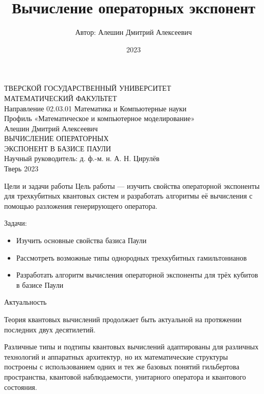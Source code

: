 \documentclass[9pt,pdf,hyperref={unicode=true}]{beamer}
\title{Вычисление операторных экспонент}
\author{Автор: Алешин Дмитрий Алексеевич}
\date{2023}
\begin{document}

\begin{frame}
\begin{center}
{\fontsize{10pt}{12pt}\selectfont
ТВЕРСКОЙ ГОСУДАРСТВЕННЫЙ УНИВЕРСИТЕТ\\
МАТЕМАТИЧЕСКИЙ ФАКУЛЬТЕТ}\\
{\fontsize{10pt}{14pt}\selectfont
    Направление 02.03.01 Математика и Компьютерные науки\\
    Профиль «Математическое и компьютерное моделирование»} \\
\vspace{1.0cm}
{\fontsize{14pt}{14pt}\selectfont Алешин Дмитрий Алексеевич\\
\vspace{0.5cm}
\textcolor{blue!60!black}{ВЫЧИСЛЕНИЕ ОПЕРАТОРНЫХ \\
\vspace{0.3cm}
ЭКСПОНЕНТ В БАЗИСЕ ПАУЛИ}}\\
\vspace{0.5cm}
{\fontsize{10pt}{10pt}\selectfont
Научный руководитель: д. ф.-м. н. А. Н. Цирулёв}\\
\vspace{1.5cm}
{\fontsize{10pt}{10pt}\selectfont Тверь 2023}
\end{center}
\end{frame}


\begin{frame}[t]{Цели и задачи работы}
Цель работы --- изучить свойства операторной экспоненты для трехкубитных квантовых систем и разработать алгоритмы её вычисления с помощью разложения генерирующего оператора.
\vspace{0.5cm}

Задачи:
\begin{itemize}
\item{Изучить основные свойства базиса Паули}
\item{Рассмотреть возможные типы однородных трехкубитных гамильтонианов }
\item{Разработать алгоритм вычисления операторной экспоненты для трёх кубитов в базисе Паули}
\end{itemize}

\end{frame}


\begin{frame}[t]{Актуальность}

Теория квантовых вычислений продолжает быть актуальной на протяжении последних двух десятилетий.

Различные типы и подтипы квантовых вычислений адаптированы для различных технологий и аппаратных архитектур, но их математические структуры построены с использованием одних и тех же базовых понятий гильбертова пространства, квантовой наблюдаемости, унитарного оператора и квантового состояния.

\end{frame}
\end{document}
